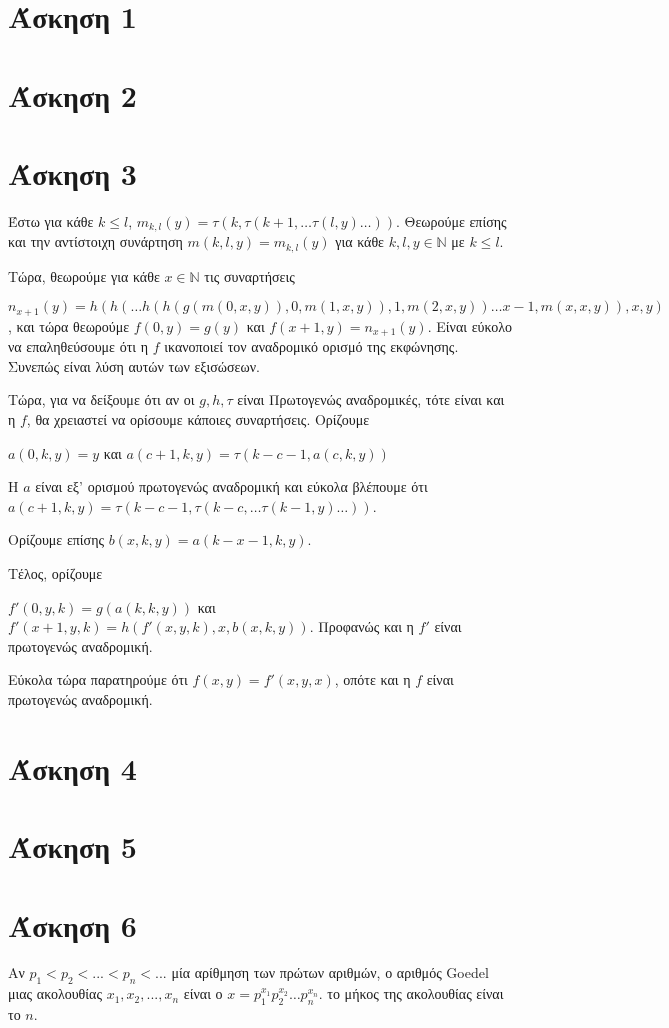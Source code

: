 \documentclass[a4paper, oneside, 11pt]{article}
\theoremstyle{definition}
\begin{document}


\section*{Άσκηση 1}
\section*{Άσκηση 2}
\section*{Άσκηση 3}
Έστω για κάθε $k\leq l$, 
$m_{k,l}(y)=\tau(k,\tau(k+1,\dots\tau(l,y)\dots))$. Θεωρούμε επίσης και την αντίστοιχη συνάρτηση $m(k,l,y)=m_{k,l}(y)$ για κάθε $k,l,y\in \mathbb{N}$ με $k\leq l$.

Τώρα, θεωρούμε για κάθε $x\in \mathbb{N}$ τις συναρτήσεις 

$n_{x+1}(y)=h(h(\dots h(h(g(m(0,x,y)),0,m(1,x,y)),1,m(2,x,y))\dots x-1,m(x,x,y)),x,y)$, και τώρα θεωρούμε
$f(0,y)=g(y)$ και $f(x+1,y)=n_{x+1}(y)$. Είναι εύκολο να επαληθεύσουμε ότι η $f$ ικανοποιεί τον αναδρομικό ορισμό της εκφώνησης. Συνεπώς είναι λύση αυτών των εξισώσεων.

Τώρα, για να δείξουμε ότι αν οι $g, h,\tau$ είναι Πρωτογενώς αναδρομικές, τότε είναι και η $f$, θα χρειαστεί να ορίσουμε κάποιες
συναρτήσεις.
Ορίζουμε

$a(0,k,y)=y$ και $a(c+1,k,y)=\tau(k-c-1,a(c,k,y))$

Η $a$ είναι εξ' ορισμού πρωτογενώς αναδρομική και εύκολα βλέπουμε ότι $a(c+1,k,y)=\tau(k-c-1,\tau(k-c,\dots\tau(k-1,y)\dots))$.

Ορίζουμε επίσης $b(x,k,y)=a(k-x-1,k,y)$. 

Τέλος, ορίζουμε

$f'(0,y,k)=g(a(k,k,y))$ και $f'(x+1,y,k)=h(f'(x,y,k),x,b(x,k,y))$. Προφανώς και η $f'$ είναι πρωτογενώς αναδρομική.

Εύκολα τώρα παρατηρούμε ότι $f(x,y)=f'(x,y,x)$, οπότε και η $f$ είναι πρωτογενώς αναδρομική.

\section*{Άσκηση 4}
\section*{Άσκηση 5}
\section*{Άσκηση 6}
Αν $p_1<p_2<...<p_n<...$ μία αρίθμηση των πρώτων αριθμών, ο αριθμός Goedel μιας ακολουθίας $x_1,x_2,...,x_n$ είναι ο
$x = p_1^{x_1}p_2^{x_2}\dots p_n^{x_n}$. το μήκος της ακολουθίας είναι το $n$.
\end{document}
